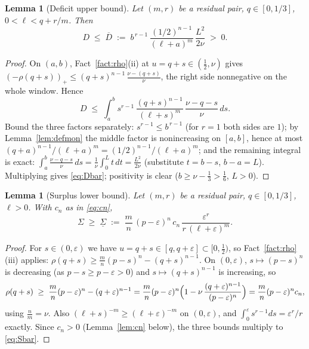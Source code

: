 \documentclass[11pt]{article}
\newtheorem{lemma}[theorem]{Lemma}
\theoremstyle{remark}
\theoremstyle{plain}
\theoremstyle{plain}
\begin{document}
\begin{lemma}[Deficit upper bound]\label{lem:deficit}
Let $(m,r)$ be a residual pair, $q\in[0,1/3]$, $0<\ell<q+r/m$.  Then
\begin{equation}\label{eq:Dbar}
        D\;\le\;\overline D
        \;:=\;
        b^{\,r-1}\,\frac{(1/2)^{n-1}}{(\ell+a)^{m}}\,\frac{L^{2}}{2\nu}
        \;>\;0.
\end{equation}
\end{lemma}

\begin{proof}
On $(a,b)$, Fact~\ref{fact:rho}(ii) at $u=q+s\in(\tfrac12,\nu)$ gives $(-\rho(q+s))_+\le(q+s)^{n-1}\,\frac{\nu-(q+s)}{\nu}$, the right side nonnegative on the whole window.  Hence
\[
        D\;\le\;\int_a^b s^{r-1}\,\frac{(q+s)^{n-1}}{(\ell+s)^{m}}\,
        \frac{\nu-q-s}{\nu}\,ds .
\]
Bound the three factors separately: $s^{r-1}\le b^{\,r-1}$ (for $r=1$ both sides are $1$); by Lemma~\ref{lem:defmon} the middle factor is nonincreasing on $[a,b]$, hence at most $(q+a)^{n-1}/(\ell+a)^{m}=(1/2)^{n-1}/(\ell+a)^{m}$; and the remaining integral is exact:
$\int_a^b\frac{\nu-q-s}{\nu}\,ds=\frac1\nu\int_0^{L}t\,dt=\frac{L^{2}}{2\nu}$ (substitute $t=b-s$, $b-a=L$).  Multiplying gives \eqref{eq:Dbar}; positivity is clear ($b\ge\nu-\tfrac13>\tfrac16$, $L>0$).
\end{proof}

\begin{lemma}[Surplus lower bound]\label{lem:surplus}
Let $(m,r)$ be a residual pair, $q\in[0,1/3]$, $\ell>0$.  With $c_n$ as in \eqref{eq:cn},
\begin{equation}\label{eq:Sbar}
        \Sigma\;\ge\;\underline\Sigma
        \;:=\;
        \frac mn\,(p-\varepsilon)^{n}\,c_n\,
        \frac{\varepsilon^{r}}{r\,(\ell+\varepsilon)^{m}} .
\end{equation}
\end{lemma}

\begin{proof}
For $s\in(0,\varepsilon)$ we have $u=q+s\in[q,q+\varepsilon]\subset[0,\tfrac12)$, so Fact~\ref{fact:rho}(iii) applies: $\rho(q+s)\ge\frac mn(p-s)^{n}-(q+s)^{n-1}$.  On $(0,\varepsilon)$, $s\mapsto(p-s)^n$ is decreasing (as $p-s\ge p-\varepsilon>0$) and $s\mapsto(q+s)^{n-1}$ is increasing, so
\[
        \rho(q+s)\;\ge\;\frac mn(p-\varepsilon)^{n}-(q+\varepsilon)^{n-1}
        =\frac mn(p-\varepsilon)^{n}
        \Bigl(1-\nu\,\frac{(q+\varepsilon)^{n-1}}{(p-\varepsilon)^{n}}\Bigr)
        =\frac mn(p-\varepsilon)^{n}c_n,
\]
using $\tfrac nm=\nu$.  Also $(\ell+s)^{-m}\ge(\ell+\varepsilon)^{-m}$ on $(0,\varepsilon)$, and $\int_0^{\varepsilon}s^{r-1}ds=\varepsilon^{r}/r$ exactly.  Since $c_n>0$ (Lemma~\ref{lem:cn} below), the three bounds multiply to \eqref{eq:Sbar}.
\end{proof}
\end{document}
